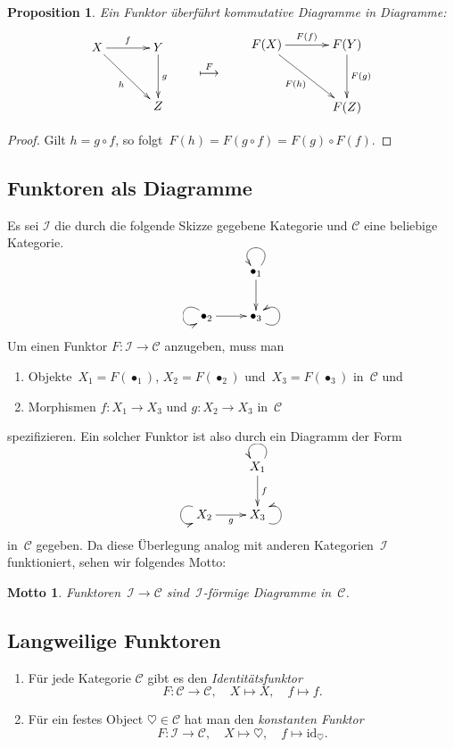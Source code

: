 \documentclass[a4paper,ngerman]{scrartcl}
\theoremstyle{definition}
\theoremstyle{plain}
\newtheorem{prop}[defn]{Proposition}
\newtheorem{motto}[defn]{Motto}
\theoremstyle{remark}
\newcommand{\I}{\mathcal{I}}
\newcommand{\C}{\mathcal{C}}
\newcommand{\id}{\mathrm{id}}
\begin{document}
\begin{prop}
Ein Funktor überführt kommutative Diagramme in Diagramme:
\[ \vcenter{ \xymatrix@=8ex{
  X \ar[r]^{f} \ar[rd]_{h} & Y \ar[d]^{g} \\
  & Z
} }
\qquad \overset{F}{\longmapsto} \qquad
\vcenter{ \xymatrix@=8ex{
  F(X) \ar[r]^{F(f)} \ar[rd]_{F(h)} & F(Y) \ar[d]^{F(g)} \\
  & F(Z)
} } \]
\end{prop}
\begin{proof}
Gilt $h = g \circ f$, so folgt~$F(h) = F(g \circ f) = F(g) \circ F(f)$.
\end{proof}


\subsection{Funktoren als Diagramme}

Es sei $\I$ die durch die folgende Skizze gegebene Kategorie und $\C$ eine beliebige Kategorie.

\[ \xymatrix{
  & \bullet_1 \ar[d] \ar@(ur,ul) \\
  \bullet_2 \ar[r] \ar@(ul,dl) & \bullet_3 \ar@(dr,ur)
} \]

Um einen Funktor $F : \I \to \C$ anzugeben, muss man
\begin{enumerate}
  \item Objekte~$X_1 = F(\bullet_1)$, $X_2 = F(\bullet_2)$ und~$X_3 =
  F(\bullet_3)$ in~$\C$ und
  \item Morphismen $f:X_1 \to X_3$ und $g:X_2 \to X_3$ in~$\C$
\end{enumerate}
spezifizieren. Ein solcher Funktor ist also durch ein Diagramm der Form

\[ \xymatrix{
  & X_1 \ar[d]^f \ar@(ur,ul) \\
  X_2 \ar[r]_g \ar@(ul,dl) & X_3 \ar@(dr,ur)
} \]
in~$\C$ gegeben. Da diese Überlegung analog mit anderen Kategorien~$\I$
funktioniert, sehen wir folgendes Motto:
\begin{motto}Funktoren~$\I \to \C$ sind~$\I$-förmige Diagramme
in~$\C$.\end{motto}


\subsection{Langweilige Funktoren}

\begin{enumerate}
  \item Für jede Kategorie $\C$ gibt es den \emph{Identitätsfunktor}
  \[ F : \C \to \C, \quad X \mapsto X, \quad f \mapsto f. \]
  \item Für ein festes Object $\heartsuit \in \C$ hat man den \emph{konstanten Funktor}
  \[ F : \I \to \C, \quad X \mapsto \heartsuit, \quad f \mapsto \id_\heartsuit. \]
\end{enumerate}
\end{document}
